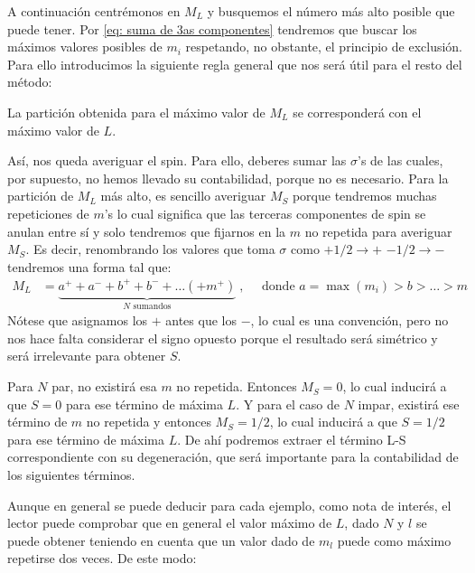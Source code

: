 A continuación centrémonos en $M_{L}$ y busquemos el número más alto posible que puede tener. Por \eqref{eq: suma de 3as componentes} tendremos que buscar los máximos valores posibles de $m_{i}$ respetando, no obstante, el principio de exclusión. Para ello introducimos la siguiente regla general que nos será útil para el resto del método:\par 
\begin{center} 
\end{center}
\vspace*{0.2cm} 
La partición obtenida para el máximo valor de $M_{L}$ se corresponderá con el máximo valor de $L$. \par 
Así, nos queda averiguar el spin. Para ello, deberes sumar las $\sigma$'s de las cuales, por supuesto, no hemos llevado su contabilidad, porque no es necesario. Para la partición de $M_{L}$ más alto, es sencillo averiguar $M_{S}$ porque tendremos muchas repeticiones de $m$'s lo cual significa que las terceras componentes de spin se anulan entre sí y solo tendremos que fijarnos en la $m$ no repetida para averiguar $M_{S}$. Es decir, renombrando los valores que toma $\sigma$ como $+1/2 \to  +$ $-1/2 \to  -$ tendremos una forma tal que: 
\begin{align*}
  M_{L} &= \underbrace{a^{+} + a^{-} + b^{+} + b^{-} + \dots (+ m^{+})}_\text{$N$ sumandos}\; , \quad \text{ donde } a=\max(m_{i})>b>\dots > m 
\end{align*}
Nótese que asignamos los $+$ antes que los $-$, lo cual es una convención, pero no nos hace falta considerar el signo opuesto porque el resultado será simétrico y será irrelevante para obtener $S$. \par
Para $N$ par, no existirá esa $m$ no repetida. Entonces $M_{S} = 0$, lo cual inducirá a que $S=0$ para ese término de máxima $L$. Y para el caso de $N$ impar, existirá ese término de $m$ no repetida y entonces $M_{S} = 1/2$, lo cual inducirá a que $S=1/2$ para ese término de máxima $L$. De ahí podremos extraer el término L-S correspondiente con su degeneración, que será importante para la contabilidad de los siguientes términos. \par
Aunque en general se puede deducir para cada ejemplo, como nota de interés, el lector puede comprobar que en general el valor máximo de $L$, dado  $N$ y $l$ se puede obtener teniendo en cuenta que un valor dado de $m_{l}$ puede como máximo repetirse dos veces. De este modo: 
